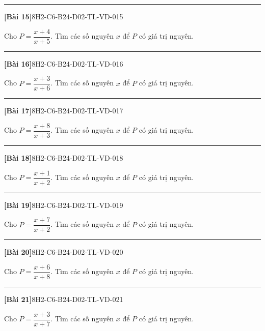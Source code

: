 \documentclass[12pt,a4paper]{article}
\newif\ifloigiai
\newenvironment{cauhoi}[2]{%
  \par\medskip\noindent\rule{\textwidth}{0.4pt}\par\nopagebreak
  \noindent\textbf{[#1]}\hfill{\scriptsize\ttfamily #2}\par\nopagebreak\smallskip}{\par}
\newcommand{\loigiai}[1]{\ifloigiai\par\smallskip\noindent\textit{Lời giải.} #1\par\fi}
\begin{document}
\begin{cauhoi}{Bài 15}{8H2-C6-B24-D02-TL-VD-015}
Cho $P=\dfrac{x+4}{x+5}$. Tìm các số nguyên $x$ để $P$ có giá trị nguyên.
\loigiai{Viết $P=\dfrac{(x+5)-1}{x+5}=1+\dfrac{-1}{x+5}$. $P$ nguyên khi $x+5$ là ước của $-1$, tức $x+5\in\{-1; 1\}$. Suy ra $x\in\{-6; -4\}$.}
\end{cauhoi}
\begin{cauhoi}{Bài 16}{8H2-C6-B24-D02-TL-VD-016}
Cho $P=\dfrac{x+3}{x+6}$. Tìm các số nguyên $x$ để $P$ có giá trị nguyên.
\loigiai{Viết $P=\dfrac{(x+6)-3}{x+6}=1+\dfrac{-3}{x+6}$. $P$ nguyên khi $x+6$ là ước của $-3$, tức $x+6\in\{-3; -1; 1; 3\}$. Suy ra $x\in\{-9; -7; -5; -3\}$.}
\end{cauhoi}
\begin{cauhoi}{Bài 17}{8H2-C6-B24-D02-TL-VD-017}
Cho $P=\dfrac{x+8}{x+3}$. Tìm các số nguyên $x$ để $P$ có giá trị nguyên.
\loigiai{Viết $P=\dfrac{(x+3)+5}{x+3}=1+\dfrac{5}{x+3}$. $P$ nguyên khi $x+3$ là ước của $5$, tức $x+3\in\{-5; -1; 1; 5\}$. Suy ra $x\in\{-8; -4; -2; 2\}$.}
\end{cauhoi}
\begin{cauhoi}{Bài 18}{8H2-C6-B24-D02-TL-VD-018}
Cho $P=\dfrac{x+1}{x+2}$. Tìm các số nguyên $x$ để $P$ có giá trị nguyên.
\loigiai{Viết $P=\dfrac{(x+2)-1}{x+2}=1+\dfrac{-1}{x+2}$. $P$ nguyên khi $x+2$ là ước của $-1$, tức $x+2\in\{-1; 1\}$. Suy ra $x\in\{-3; -1\}$.}
\end{cauhoi}
\begin{cauhoi}{Bài 19}{8H2-C6-B24-D02-TL-VD-019}
Cho $P=\dfrac{x+7}{x+2}$. Tìm các số nguyên $x$ để $P$ có giá trị nguyên.
\loigiai{Viết $P=\dfrac{(x+2)+5}{x+2}=1+\dfrac{5}{x+2}$. $P$ nguyên khi $x+2$ là ước của $5$, tức $x+2\in\{-5; -1; 1; 5\}$. Suy ra $x\in\{-7; -3; -1; 3\}$.}
\end{cauhoi}
\begin{cauhoi}{Bài 20}{8H2-C6-B24-D02-TL-VD-020}
Cho $P=\dfrac{x+6}{x+8}$. Tìm các số nguyên $x$ để $P$ có giá trị nguyên.
\loigiai{Viết $P=\dfrac{(x+8)-2}{x+8}=1+\dfrac{-2}{x+8}$. $P$ nguyên khi $x+8$ là ước của $-2$, tức $x+8\in\{-2; -1; 1; 2\}$. Suy ra $x\in\{-10; -9; -7; -6\}$.}
\end{cauhoi}
\begin{cauhoi}{Bài 21}{8H2-C6-B24-D02-TL-VD-021}
Cho $P=\dfrac{x+3}{x+7}$. Tìm các số nguyên $x$ để $P$ có giá trị nguyên.
\loigiai{Viết $P=\dfrac{(x+7)-4}{x+7}=1+\dfrac{-4}{x+7}$. $P$ nguyên khi $x+7$ là ước của $-4$, tức $x+7\in\{-4; -2; -1; 1; 2; 4\}$. Suy ra $x\in\{-11; -9; -8; -6; -5; -3\}$.}
\end{cauhoi}
\end{document}
